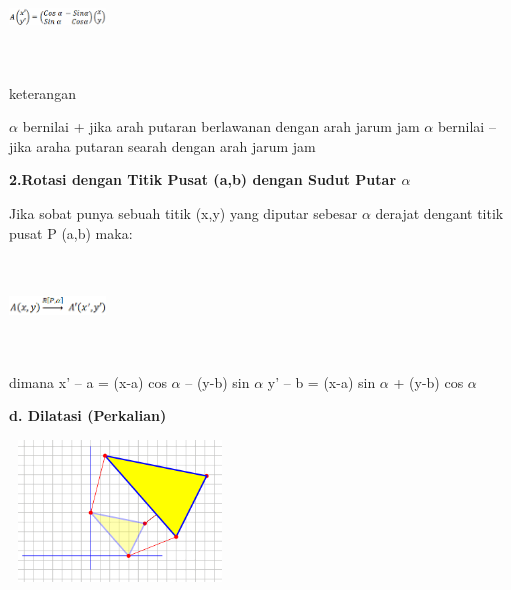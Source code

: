 \documentclass[11pt,fleqn]{book} %
\begin{document}
\noindent
\begin{center}
	\noindent \includegraphics*[width=1.01in, height=1.01in, keepaspectratio=false, trim=0.00in 0.11in 0.00in 0.00in]{Pictures/7.PNG}
\end{center}

\noindent
keterangan

\noindent $\alpha$  bernilai + jika arah putaran berlawanan dengan arah jarum jam
\noindent $\alpha$ bernilai – jika araha putaran searah dengan arah jarum jam


\noindent \textbf{2.Rotasi dengan Titik Pusat (a,b) dengan Sudut Putar $\alpha$}

\noindent
Jika sobat punya sebuah titik (x,y) yang diputar sebesar $\alpha$ derajat dengant titik pusat P (a,b) maka:
\noindent
\begin{center}
	\noindent \includegraphics*[width=1.01in, height=1.01in, keepaspectratio=false, trim=0.00in 0.11in 0.00in 0.00in]{Pictures/8.PNG}
\end{center}

\noindent
dimana
\noindent x’ – a = (x-a) cos $\alpha$ – (y-b) sin $\alpha$
\noindent y’ – b = (x-a) sin $\alpha$  + (y-b) cos $\alpha$

\noindent \textbf{d. Dilatasi (Perkalian)}

\noindent
\begin{center}
	\noindent \includegraphics*[width=2.32in, height=1.48in, keepaspectratio=false, trim=0.00in 0.11in 0.00in 0.00in]{Pictures/9.PNG}
\end{center}
\end{document}
